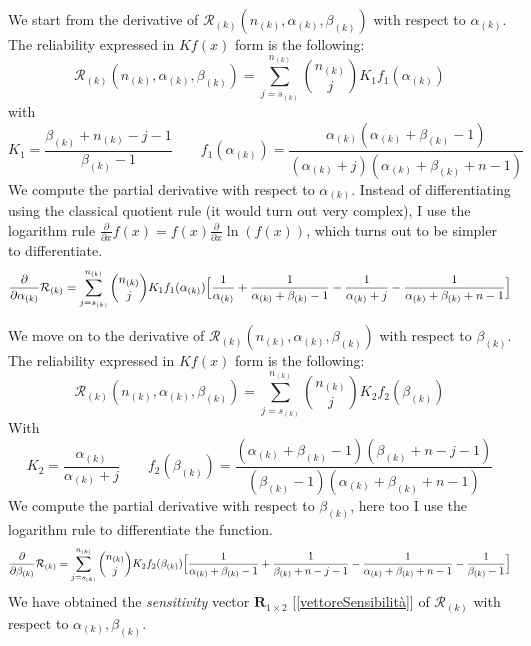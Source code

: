 \documentclass[10pt]{article} %
\begin{document}
We start from the derivative of $\mathcal{R}_{(k)}(n_{(k)}, \alpha_{(k)}, \beta_{(k)})$ with respect to $\alpha_{(k)}$.\\
The reliability expressed in $Kf(x)$ form is the following:
\begin{equation}
    \mathcal{R}_{(k)}(n_{(k)}, \alpha_{(k)}, \beta_{(k)}) = \sum_{j = s_{(k)}}^{n_{(k)}} \binom{n_{(k)}}{j} K_{1}f_{1}(\alpha_{(k)})
\end{equation}
with
\begin{equation}
    K_{1} = \dfrac{\beta_{(k)} + n_{(k)} - j - 1}{\beta_{(k)} - 1} \qquad
    f_{1}(\alpha_{(k)}) = \dfrac{\alpha_{(k)}(\alpha_{(k)}+\beta_{(k)} -1)}{(\alpha_{(k)} + j)(\alpha_{(k)}+\beta_{(k)}+n-1)}
\end{equation}
We compute the partial derivative with respect to $\alpha_{(k)}$. Instead of differentiating using the classical quotient rule (it would turn out very complex), I use the logarithm rule $\frac{\partial}{\partial x}f(x) = f(x)\frac{\partial}{\partial x}\ln(f(x))$, which turns out to be simpler to differentiate.
\begin{equation}
    \dfrac{\partial}{\partial \alpha_{(k)}}\mathcal{R}_{(k)}= \sum_{j = s_{(k)}}^{n_{(k)}} \binom{n_{(k)}}{j} K_{1}f_{1}(\alpha_{(k)})
    \Bigl[ \frac{1}{\alpha_{(k)}} + \frac{1}{\alpha_{(k)} + \beta_{(k)} -1} -\frac{1}{\alpha_{(k)}+j} - \frac{1}{\alpha_{(k)} + \beta_{(k)} + n -1}\Bigr]
\end{equation}

We move on to the derivative of $\mathcal{R}_{(k)}(n_{(k)}, \alpha_{(k)}, \beta_{(k)})$ with respect to $\beta_{(k)}$.\\
The reliability expressed in $Kf(x)$ form is the following:
\begin{equation}
    \mathcal{R}_{(k)}(n_{(k)}, \alpha_{(k)}, \beta_{(k)}) = \sum_{j = s_{(k)}}^{n_{(k)}} \binom{n_{(k)}}{j} K_{2}f_{2}(\beta_{(k)})
\end{equation}
With
\begin{equation}
    K_{2} = \dfrac{\alpha_{(k)}}{\alpha_{(k)} + j} \qquad
    f_{2}(\beta_{(k)}) = \dfrac{(\alpha_{(k)} + \beta_{(k)} - 1)(\beta_{(k)} + n - j - 1)}{(\beta_{(k)}-1)(\alpha_{(k)}+ \beta_{(k)} + n -1)}
\end{equation}
We compute the partial derivative with respect to $\beta_{(k)}$, here too I use the logarithm rule to differentiate the function.
\begin{equation}
    \dfrac{\partial}{\partial \beta_{(k)}}\mathcal{R}_{(k)}= \sum_{j = s_{(k)}}^{n_{(k)}} \binom{n_{(k)}}{j} K_{2}f_{2}(\beta_{(k)})
    \Bigl[ \frac{1}{\alpha_{(k)} + \beta_{(k)} - 1} + \frac{1}{\beta_{(k)} + n - j - 1} -\frac{1}{\alpha_{(k)}+\beta_{(k)} + n -1} - \frac{1}{\beta_{(k)} - 1}\Bigr]
\end{equation}
We have obtained the \textit{sensitivity} vector $\mathbf{R}_{1\times2}$ [\ref{vettoreSensibilità}] of $\mathcal{R}_{(k)}$ with respect to $\alpha_{(k)}, \beta_{(k)}$.
\end{document}
